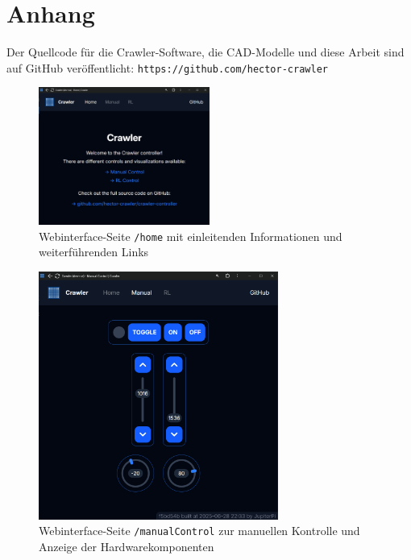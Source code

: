 \section*{Anhang}
\label{sec:anhang}

Der Quellcode für die Crawler-Software, die CAD-Modelle und diese Arbeit sind auf GitHub veröffentlicht: 
\texttt{https://github.com/hector-crawler}

\label{fig:webinterface_screenshots}

\begin{figure}[H]
    \includegraphics[width=0.5\textwidth]{photos/webinterface_home.png}
    \caption{Webinterface-Seite \texttt{/home} mit einleitenden Informationen und weiterführenden Links}
\end{figure}

\begin{figure}[H]
	\includegraphics[width=0.7\textwidth]{photos/webinterface_manualControl.png}
    \caption{Webinterface-Seite \texttt{/manualControl} zur manuellen Kontrolle und Anzeige der Hardwarekomponenten}
\end{figure}

